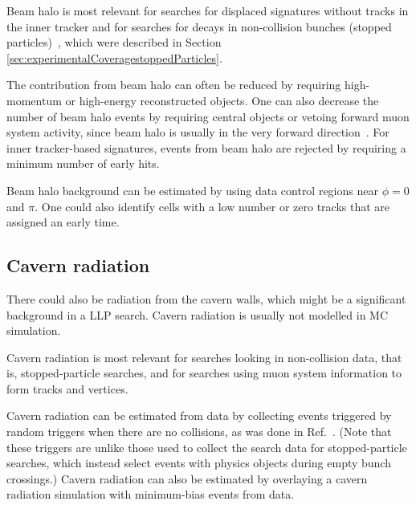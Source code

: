 Beam halo is most relevant for searches for displaced signatures without tracks in the inner tracker and for searches for decays in non-collision bunches (stopped particles)~\cite{Khachatryan:2015jha, Chatrchyan:2012dxa, Khachatryan:2010uf}, which were described in Section \ref{sec:experimentalCoveragestoppedParticles}.

The contribution from beam halo can often be reduced by requiring high-momentum or high-energy reconstructed objects. One can also decrease the number of beam halo events by requiring central objects or vetoing forward muon system activity, since beam halo is usually in the very forward direction~\cite{Khachatryan:2015jha, Chatrchyan:2012dxa, Khachatryan:2010uf}. For inner tracker-based signatures, events from beam halo are rejected by requiring a minimum number of early hits.

Beam halo background can be estimated by using data control regions near $\phi=0$ and $\pi$. One could also identify cells with a low number or zero tracks that are assigned an early time. %

\subsection{Cavern radiation} %

There could also be radiation from the cavern walls, which might be a significant background in a LLP search. %
Cavern radiation is usually not modelled in MC simulation.

Cavern radiation is most relevant for searches looking in non-collision data, that is, stopped-particle searches, and for searches using muon system information to form tracks and vertices.

Cavern radiation can be estimated from data by collecting events triggered by random triggers when there are no collisions, as was done in Ref.~\cite{Aad:2013gva}. (Note that these triggers are unlike those used to collect the search data for stopped-particle searches, which instead select events with physics objects during empty bunch crossings.) Cavern radiation can also be estimated by overlaying a cavern radiation simulation with minimum-bias events from data.


